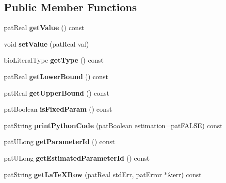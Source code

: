 \subsection*{Public Member Functions}
\begin{DoxyCompactItemize}
\item 
\mbox{\label{classbio_fixed_parameter_ace264a805e77aa967d8819501f2f2d9b}} 
pat\+Real {\bfseries get\+Value} () const
\item 
\mbox{\label{classbio_fixed_parameter_ae78e294fbbcb8355bfc15ea211f713fa}} 
void {\bfseries set\+Value} (pat\+Real val)
\item 
\mbox{\label{classbio_fixed_parameter_ad18b61b64b980d55152199f10676c151}} 
bio\+Literal\+Type {\bfseries get\+Type} () const
\item 
\mbox{\label{classbio_fixed_parameter_ac92d7dd89fb8597f54f014c508828531}} 
pat\+Real {\bfseries get\+Lower\+Bound} () const
\item 
\mbox{\label{classbio_fixed_parameter_a6448f8302f34abfc7072af821021ea39}} 
pat\+Real {\bfseries get\+Upper\+Bound} () const
\item 
\mbox{\label{classbio_fixed_parameter_aa37d5d4a9d1164f8cda12cb4f97cf125}} 
pat\+Boolean {\bfseries is\+Fixed\+Param} () const
\item 
\mbox{\label{classbio_fixed_parameter_a28b67f8170ac95d2f4393981caa5d54c}} 
pat\+String {\bfseries print\+Python\+Code} (pat\+Boolean estimation=pat\+F\+A\+L\+SE) const
\item 
\mbox{\label{classbio_fixed_parameter_a416efa66d05bbf24d32ac7bb67ddcdff}} 
pat\+U\+Long {\bfseries get\+Parameter\+Id} () const
\item 
\mbox{\label{classbio_fixed_parameter_a5762200b6577b190fb8e7e084d3d993f}} 
pat\+U\+Long {\bfseries get\+Estimated\+Parameter\+Id} () const
\item 
\mbox{\label{classbio_fixed_parameter_af787b70a25f7c325383172224b74a9ef}} 
pat\+String {\bfseries get\+La\+Te\+X\+Row} (pat\+Real std\+Err, pat\+Error $\ast$\&err) const
\end{DoxyCompactItemize}
